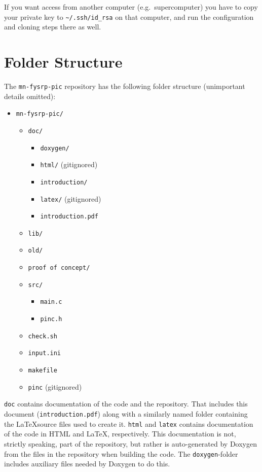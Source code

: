\documentclass[10pt,a4paper]{article}
\newcommand{\mnfysrppic}{\texttt{mn-fysrp-pic}}
\begin{document}
If you want access from another computer (e.g.\ supercomputer) you have to copy your private key to \verb$~/.ssh/id_rsa$ on that computer, and run the configuration and cloning steps there as well. 

\section{Folder Structure}
The \mnfysrppic{} repository has the following folder structure (unimportant details omitted):

\begin{itemize}[label={}]
	\item \verb$mn-fysrp-pic/$
	\begin{itemize}[label={}]
		\item \verb$doc/$
		\begin{itemize}[label={}]
			\item \verb$doxygen/$
			\item \verb$html/$ (gitignored)
			\item \verb$introduction/$
			\item \verb$latex/$ (gitignored)
			\item \verb$introduction.pdf$
		\end{itemize}
		\item \verb$lib/$
		\item \verb$old/$
		\item \verb$proof of concept/$
		\item \verb$src/$
		\begin{itemize}[label={}]
			\item \verb$main.c$
			\item \verb$pinc.h$
		\end{itemize}
		\item \verb$check.sh$
		\item \verb$input.ini$
		\item \verb$makefile$
		\item \verb$pinc$ (gitignored)
	\end{itemize}
\end{itemize}

\verb$doc$ contains documentation of the code and the repository. That includes this document (\verb$introduction.pdf$) along with a similarly named folder containing the \LaTeX source files used to create it. \verb$html$ and \verb$latex$ contains documentation of the code in HTML and LaTeX, respectively. This documentation is not, strictly speaking, part of the repository, but rather is auto-generated by Doxygen from the files in the repository when building the code. The \verb$doxygen$-folder includes auxiliary files needed by Doxygen to do this.
\end{document}
